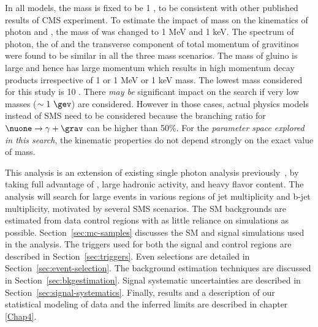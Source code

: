 In all models, the mass \grav is fixed to be 1 \gev, to be consistent with other published results of CMS experiment. 
To estimate the impact of \grav mass on the kinematics of photon and \grav, the mass of \grav was changed to 1 MeV and 1 keV. The \pt
spectrum of photon, the \pt of \grav and the transverse component of total momentum of gravitinos were found to be similar in all the
three \grav mass scenarios. The mass of gluino is large and hence \nuone has large momentum which 
results in high momentum decay products irrespective of 1 \gev or 1 MeV or 1 keV \grav mass.
The lowest \nuone mass considered for this study is 10 \gev. There \textit{may be} significant impact on the search if very low \nuone 
masses ($\sim 1\ \gev$) are considered. However in those cases, actual physics models instead of SMS need to be considered because the
branching ratio for $\nuone \to \gamma+\grav$ can be higher than 50\%. For the \textit{parameter
space explored in this search}, the kinematic properties do not depend strongly on the exact value of \grav mass.

This analysis is an extension of existing single photon analysis previously~\cite{Sirunyan:2017yse}, by taking full advantage
of \ptmiss, large hadronic activity, and heavy flavor content.  The analysis will search for large \ptmiss events
in various regions of jet multiplicity and b-jet multiplicity, motivated by several SMS scenarios.  The 
SM backgrounds are estimated from data control regions with as little reliance on simulations as possible.
Section~\ref{sec:mc-samples} discusses the SM and signal simulations used in the analysis.
The triggers used for both the signal and control regions are described in Section~\ref{sec:triggers}.   
Even selections are detailed in Section~\ref{sec:event-selection}. The background 
estimation techniques are discussed in Section~\ref{sec:bkgestimation}.  Signal systematic uncertainties are described in Section~\ref{sec:signal-systematics}.
Finally, results and a description of our statistical modeling of data and the inferred limits are described 
in chapter \ref{Chap4}.

